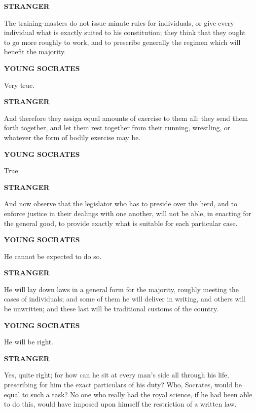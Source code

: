 \documentclass[11pt,letter]{article}
\begin{document}
\par \textbf{STRANGER}
\par   The training-masters do not issue minute rules for individuals, or give every individual what is exactly suited to his constitution; they think that they ought to go more roughly to work, and to prescribe generally the regimen which will benefit the majority.

\par \textbf{YOUNG SOCRATES}
\par   Very true.

\par \textbf{STRANGER}
\par   And therefore they assign equal amounts of exercise to them all; they send them forth together, and let them rest together from their running, wrestling, or whatever the form of bodily exercise may be.

\par \textbf{YOUNG SOCRATES}
\par   True.

\par \textbf{STRANGER}
\par   And now observe that the legislator who has to preside over the herd, and to enforce justice in their dealings with one another, will not be able, in enacting for the general good, to provide exactly what is suitable for each particular case.

\par \textbf{YOUNG SOCRATES}
\par   He cannot be expected to do so.

\par \textbf{STRANGER}
\par   He will lay down laws in a general form for the majority, roughly meeting the cases of individuals; and some of them he will deliver in writing, and others will be unwritten; and these last will be traditional customs of the country.

\par \textbf{YOUNG SOCRATES}
\par   He will be right.

\par \textbf{STRANGER}
\par   Yes, quite right; for how can he sit at every man's side all through his life, prescribing for him the exact particulars of his duty? Who, Socrates, would be equal to such a task? No one who really had the royal science, if he had been able to do this, would have imposed upon himself the restriction of a written law.
\end{document}

